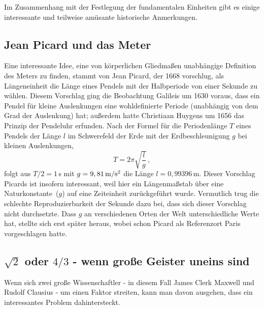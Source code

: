 Im Zusammenhang mit der Festlegung der fundamentalen Einheiten gibt es einige 
interessante und teilweise am\"usante historische Anmerkungen.

\subsection{Jean Picard und das Meter}

Eine interessante Idee,
eine von k\"orperlichen Gliedma\ss en unabh\"angige Definition des Meters zu finden, stammt
von Jean Picard, der 1668 vorschlug, als L\"angeneinheit die L\"ange eines Pendels mit der Halbperiode 
von einer Sekunde zu w\"ahlen. Diesem Vorschlag ging die Beobachtung Galileis um 1630 voraus, dass
ein Pendel f\"ur kleine Auslenkungen eine wohldefinierte Periode (unabh\"angig von dem Grad
der Auslenkung) hat; au\ss erdem hatte 
Christiaan Huygens um 1656 das Prinzip der Pendeluhr
erfunden. Nach der Formel f\"ur die Periodenl\"ange $T$ eines Pendels der L\"ange $l$ im Schwerefeld
der Erde mit der Erdbeschleunigung $g$ bei kleinen Auslenkungen,
\begin{equation}
       T = 2 \pi \sqrt{\frac{l}{g}}   \, ,
\end{equation}
folgt aus $T/2=1$\,s mit $g=9,81\,{\rm m/s^2}$ die L\"ange $l=0,99396$\,m. Dieser Vorschlag Picards ist insofern
interessant, weil hier ein L\"angenma\ss stab \"uber eine \glqq Naturkonstante\grqq\ ($g$) auf eine
Zeiteinheit zur\"uckgef\"uhrt wurde. Vermutlich trug die schlechte Reproduzierbarkeit der Sekunde
dazu bei, dass sich dieser Vorschlag nicht durchsetzte. Dass $g$ an verschiedenen Orten der Welt
unterschiedliche Werte hat, stellte sich erst sp\"ater heraus, wobei schon Picard als Referenzort
Paris vorgeschlagen hatte. 

\subsection{$\sqrt{2}$ oder $4/3$ - wenn gro\ss e Geister uneins sind}
\label{sec_SI_Kur}

Wenn sich zwei gro\ss e Wissenschaftler - in diesem Fall James Clerk Maxwell und Rudolf Clausius - um 
einen Faktor streiten, kann man davon ausgehen, dass ein interessantes Problem dahintersteckt.  

